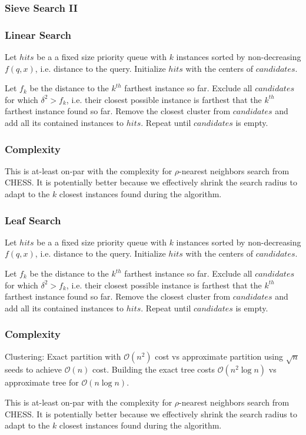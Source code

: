 \subsubsection{Sieve Search II}
\label{subsubsec:methods:knn-search:sieve2}

\subsubsection{Linear Search}
\label{subsubsec:methods:knn-search:leaf-search}

Let $hits$ be a a fixed size priority queue with $k$ instances sorted by non-decreasing $f(q, x)$, i.e. distance to the query.
Initialize $hits$ with the centers of $candidates$.

Let $f_k$ be the distance to the $k^{th}$ farthest instance so far.
Exclude all $candidates$ for which $\delta^2 > f_k$, i.e. their closest possible instance is farthest that the $k^{th}$ farthest instance found so far.
Remove the closest cluster from $candidates$ and add all its contained instances to $hits$.
Repeat until $candidates$ is empty.

\subsubsection{Complexity}
\label{subsubsec:methods:knn-search:complexity}

This is at-least on-par with the complexity for $\rho$-nearest neighbors search from CHESS.
It is potentially better because we effectively shrink the search radius to adapt to the $k$ closest instances found during the algorithm.


\subsubsection{Leaf Search}
\label{subsubsec:methods:knn-search:leaf-search}

Let $hits$ be a a fixed size priority queue with $k$ instances sorted by non-decreasing $f(q, x)$, i.e. distance to the query.
Initialize $hits$ with the centers of $candidates$.

Let $f_k$ be the distance to the $k^{th}$ farthest instance so far.
Exclude all $candidates$ for which $\delta^2 > f_k$, i.e. their closest possible instance is farthest that the $k^{th}$ farthest instance found so far.
Remove the closest cluster from $candidates$ and add all its contained instances to $hits$.
Repeat until $candidates$ is empty.

\subsubsection{Complexity}
\label{subsubsec:methods:knn-search:complexity}

Clustering: Exact partition with $\mathcal{O}(n^2)$ cost vs approximate partition using $\sqrt{n}$ seeds to achieve $\mathcal{O}(n)$ cost.
Building the exact tree costs $\mathcal{O}(n^2 \log n)$ vs approximate tree for $\mathcal{O}(n \log n)$.

This is at-least on-par with the complexity for $\rho$-nearest neighbors search from CHESS.
It is potentially better because we effectively shrink the search radius to adapt to the $k$ closest instances found during the algorithm.
